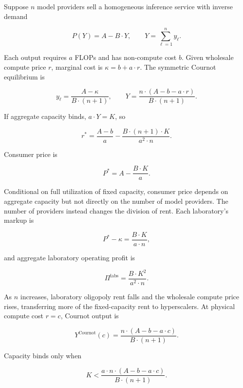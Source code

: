 \documentclass[11pt]{article}
\begin{document}
Suppose $n$ model providers sell a homogeneous inference service with inverse demand

\begin{equation}P(Y)=A-B\cdot Y,\qquad Y=\sum_{\ell=1}^{n}y_\ell.\end{equation}

Each output requires $a$ FLOPs and has non-compute cost $b$. Given wholesale compute price $r$, marginal cost is $\kappa=b+a\cdot r$. The symmetric Cournot equilibrium is

\begin{equation}y_\ell=\frac{A-\kappa}{B\cdot(n+1)},\qquad Y=\frac{n\cdot(A-b-a\cdot r)}{B\cdot(n+1)}.\end{equation}

If aggregate capacity binds, $a\cdot Y=K$, so

\begin{equation}r^*=\frac{A-b}{a}-\frac{B\cdot(n+1)\cdot K}{a^2\cdot n}.\end{equation}

Consumer price is

\begin{equation}P^*=A-\frac{B\cdot K}{a}.\end{equation}

Conditional on full utilization of fixed capacity, consumer price depends on aggregate capacity but not directly on the number of model providers. The number of providers instead changes the division of rent. Each laboratory's markup is

\begin{equation}P^*-\kappa=\frac{B\cdot K}{a\cdot n},\end{equation}

and aggregate laboratory operating profit is

\begin{equation}\Pi^{\mathrm{labs}}=\frac{B\cdot K^2}{a^2\cdot n}.\end{equation}

As $n$ increases, laboratory oligopoly rent falls and the wholesale compute price rises, transferring more of the fixed-capacity rent to hyperscalers. At physical compute cost $r=c$, Cournot output is

\begin{equation}Y^{\mathrm{Cournot}}(c)=\frac{n\cdot(A-b-a\cdot c)}{B\cdot(n+1)}.\end{equation}

Capacity binds only when

\begin{equation}\label{eq:cournot-slack-threshold}K<\frac{a\cdot n\cdot(A-b-a\cdot c)}{B\cdot(n+1)}.\end{equation}
\end{document}
